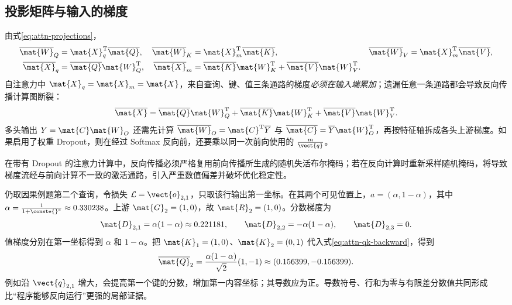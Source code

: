 \documentclass[../textbook.tex]{subfiles}
\begin{document}
\subsection{投影矩阵与输入的梯度}
由式\eqref{eq:attn-projections}，
\begin{align}
 \overline{\mat{W}}_Q&=\mat{X}_q^{\mathrm{T}}\overline{\mat{Q}},&
 \overline{\mat{W}}_K&=\mat{X}_m^{\mathrm{T}}\overline{\mat{K}},&
 \overline{\mat{W}}_V&=\mat{X}_m^{\mathrm{T}}\overline{\mat{V}},\\
 \overline{\mat{X}}_q&=\overline{\mat{Q}}\mat{W}_Q^{\mathrm{T}},&
 \overline{\mat{X}}_m&=\overline{\mat{K}}\mat{W}_K^{\mathrm{T}}+\overline{\mat{V}}\mat{W}_V^{\mathrm{T}}.
\end{align}
自注意力中 $\mat{X}_q=\mat{X}_m=\mat{X}$，来自查询、键、值三条通路的梯度\emph{必须在输入端累加}；遗漏任意一条通路都会导致反向传播计算图断裂：
\begin{equation}
 \overline{\mat{X}}=\overline{\mat{Q}}\mat{W}_Q^{\mathrm{T}}+
 \overline{\mat{K}}\mat{W}_K^{\mathrm{T}}+\overline{\mat{V}}\mat{W}_V^{\mathrm{T}}.
\end{equation}
多头输出 $Y=\mat{C}\mat{W}_O$ 还需先计算 $\overline{\mat{W}}_O=\mat{C}^{\mathrm{T}}\overline Y$ 与 $\overline{\mat{C}}=\overline Y\mat{W}_O^{\mathrm{T}}$，再按特征轴拆成各头上游梯度。如果启用了权重 Dropout，则在经过 Softmax 反向前，还要乘以同一次前向使用的 $\frac{m}{\vect{q}}$。

\begin{warning}
在带有 Dropout 的注意力计算中，反向传播必须严格复用前向传播所生成的随机失活布尔掩码；若在反向计算时重新采样随机掩码，将导致梯度流经与前向计算不一致的激活通路，引入严重数值偏差并破坏优化稳定性。
\end{warning}

\begin{example}[注意力的局部梯度]
仍取因果例题第二个查询，令损失 $\mathcal L=\vect{o}_{2,1}$，只取该行输出第一坐标。在其两个可见位置上，$a=(\alpha,1-\alpha)$，其中 $\alpha=\frac{1}{1+\conste{}^c}\approx0.330238$。上游 $\mat{G}_2=(1,0)$，故 $\mat{R}_2=(1,0)$。分数梯度为
\begin{equation*}
 \mat{D}_{2,1}=\alpha(1-\alpha)\approx0.221181,
 \qquad \mat{D}_{2,2}=-\alpha(1-\alpha),\qquad \mat{D}_{2,3}=0.
\end{equation*}
值梯度分别在第一坐标得到 $\alpha$ 和 $1-\alpha$。把 $\mat{K}_1=(1,0)$、$\mat{K}_2=(0,1)$ 代入式\eqref{eq:attn-qk-backward}，得到
\begin{equation*}
 \overline{\mat{Q}}_2=\frac{\alpha(1-\alpha)}{\sqrt2}(1,-1)
 \approx(0.156399,-0.156399).
\end{equation*}
例如沿 $\vect{q}_{2,1}$ 增大，会提高第一个键的分数，增加第一内容坐标；其导数应为正。导数符号、行和为零与有限差分数值共同形成比“程序能够反向运行”更强的局部证据。
\end{example}
\end{document}
